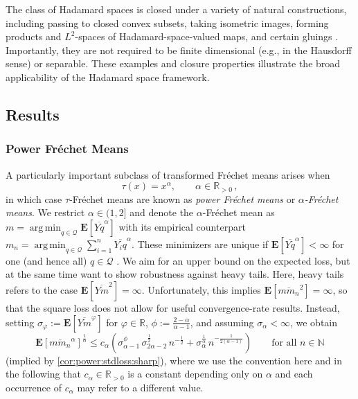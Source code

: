 \documentclass{article}
\newcommand*{\mc}[1]{\mathcal{#1}}
\newcommand{\N}{\mathbb{N}}
\newcommand{\R}{\mathbb{R}}
\newcommand{\Rpp}{\R_{>0}}
\newcommand{\lab}{\left[} %
\newcommand{\rab}{\right]} %
\newcommand{\ab}[1]{\lab #1 \rab} %
\newcommand{\abOf}[1]{\!\ab{#1}} %
\newcommand{\lb}{\left(} %
\newcommand{\rb}{\right)} %
\newcommand{\br}[1]{\lb #1 \rb} %
\newcommand{\E}{\mathbf{E}} %
\newcommand{\Eof}[1]{\E[#1]}
\newcommand{\EOf}[1]{\E\abOf{#1}}
\newcommand{\eqcm}{\,,} %
\DeclareMathOperator*{\argmin}{arg\,min}
\newcommand{\ol}[2]{\overline{#1#2}}
\newcommand{\tran}{\tau}
\begin{document}
The class of Hadamard spaces is closed under a variety of natural constructions, including passing to closed convex subsets, taking isometric images, forming products and $L^2$-spaces of Hadamard-space-valued maps, and certain gluings \cite[Sec.\ 3]{sturm03}. Importantly, they are not required to be finite dimensional (e.g., in the Hausdorff sense) or separable. These examples and closure properties illustrate the broad applicability of the Hadamard space framework.

\subsection{Results}
%
\subsubsection{Power Fr\'echet Means}
A particularly important subclass of transformed Fr\'echet means arises when 
\begin{equation}
    \tran(x) = x^\alpha, \qquad \alpha \in\Rpp
    \eqcm
\end{equation}
in which case $\tran$-Fr\'echet means are known as \emph{power Fr\'echet means} or \emph{$\alpha$-Fr\'echet means}. 
We restrict $\alpha \in (1,2]$ and denote the $\alpha$-Fr\'echet mean as $m = \argmin_{q\in\mc Q} \Eof{\ol Yq^\alpha}$ with its empirical counterpart $m_n = \argmin_{q\in\mc Q} \sum_{i=1}^n \ol{Y_i}q^\alpha$. These minimizers are unique if $\Eof{\ol Yq^\alpha} < \infty$ for one (and hence all) $q\in\mc Q$ \cite[Corollary 5.8]{varinequ}. 
We aim for an upper bound on the expected loss, but at the same time want to show robustness against heavy tails. Here, heavy tails refers to the case $\Eof{\ol Ym^2} = \infty$. Unfortunately, this implies $\Eof{\ol m{m_n}^2} = \infty$, so that the square loss does not allow for useful convergence-rate results.
Instead, setting $\sigma_\varphi := \Eof{\ol Ym^\varphi}$ for $\varphi\in\R$, $\phi := \frac{2-\alpha}{\alpha-1}$, and assuming $\sigma_\alpha < \infty$, we obtain 
\begin{equation}\label{eq:intro:pw:simple}
    \EOf{\ol{m}{m_n}^\alpha}^{\frac1\alpha}
    \leq
    c_\alpha \br{
        \sigma_{\alpha-1}^{\phi}\, \sigma_{2\alpha-2}^{\frac12}\, n^{-\frac12}
        +
        \sigma_\alpha^{\frac1\alpha}\, n^{-\frac{1}{2(\alpha-1)}}
    }
    \qquad\text{for all } n\in\N
\end{equation}
(implied by \cref{cor:power:stdloss:sharp}), 
where we use the convention here and in the following that $c_\alpha\in\Rpp$ is a constant depending only on $\alpha$ and each occurrence of $c_\alpha$ may refer to a different value.
\end{document}
